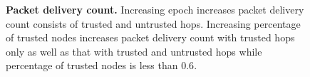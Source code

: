 \documentclass[11pt]{article}
\begin{document}
\begin{figure}[t!]
\center
{}
\hfill
{}
\caption{{\bf Packet delivery count.}
Increasing epoch increases packet delivery count consists of trusted and untrusted hops.  Increasing percentage of trusted nodes increases packet delivery count with trusted hops only as well as that with trusted and untrusted hops while percentage of trusted nodes is less than $0.6$.
}
\label{fig:delivery_count}
\end{figure}
\end{document}
